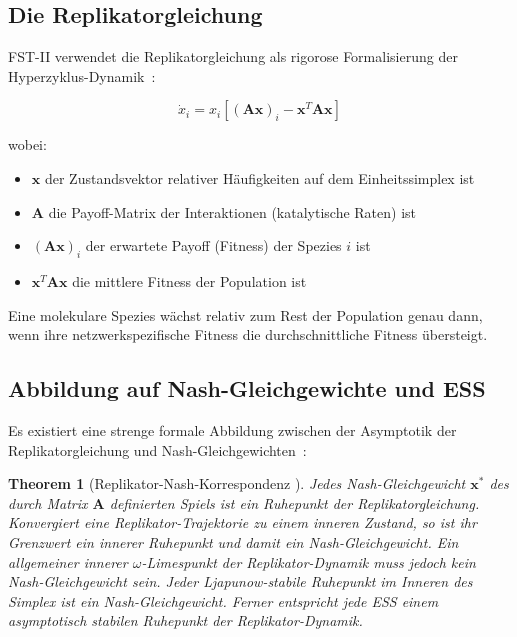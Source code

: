 \documentclass[12pt,a4paper]{article}
\newtheorem{theorem}{Theorem}
\theoremstyle{remark}
\begin{document}
\subsection{Die Replikatorgleichung}

FST-II verwendet die Replikatorgleichung als rigorose Formalisierung der Hyperzyklus-Dynamik~\citep{ReplicatorEntropy,ReplicatorDiffusion}:

\begin{equation}
\dot{x}_i = x_i \left[ (\mathbf{A}\mathbf{x})_i - \mathbf{x}^T \mathbf{A} \mathbf{x} \right]
\end{equation}

wobei:
\begin{itemize}
    \item $\mathbf{x}$ der Zustandsvektor relativer Häufigkeiten auf dem Einheitssimplex ist
    \item $\mathbf{A}$ die Payoff-Matrix der Interaktionen (katalytische Raten) ist
    \item $(\mathbf{A}\mathbf{x})_i$ der erwartete Payoff (Fitness) der Spezies $i$ ist
    \item $\mathbf{x}^T \mathbf{A} \mathbf{x}$ die mittlere Fitness der Population ist
\end{itemize}

Eine molekulare Spezies wächst relativ zum Rest der Population genau dann, wenn ihre netzwerkspezifische Fitness die durchschnittliche Fitness übersteigt.

\subsection{Abbildung auf Nash-Gleichgewichte und ESS}

Es existiert eine strenge formale Abbildung zwischen der Asymptotik der Replikatorgleichung und Nash-Gleichgewichten~\citep{HofbauerSigmund1998,HofbauerSigmund2003}:

\begin{theorem}[Replikator-Nash-Korrespondenz {\citep{HofbauerSigmund2003,HofbauerSigmund1998}}]
\label{thm:replicator-nash}
Jedes Nash-Gleichgewicht $\mathbf{x}^*$ des durch Matrix $\mathbf{A}$ definierten Spiels ist ein Ruhepunkt der Replikatorgleichung. Konvergiert eine Replikator-Trajektorie zu einem inneren Zustand, so ist ihr Grenzwert ein innerer Ruhepunkt und damit ein Nash-Gleichgewicht. Ein allgemeiner innerer $\omega$-Limespunkt der Replikator-Dynamik muss jedoch kein Nash-Gleichgewicht sein. Jeder Ljapunow-stabile Ruhepunkt im Inneren des Simplex ist ein Nash-Gleichgewicht. Ferner entspricht jede ESS einem asymptotisch stabilen Ruhepunkt der Replikator-Dynamik.
\end{theorem}
\end{document}
